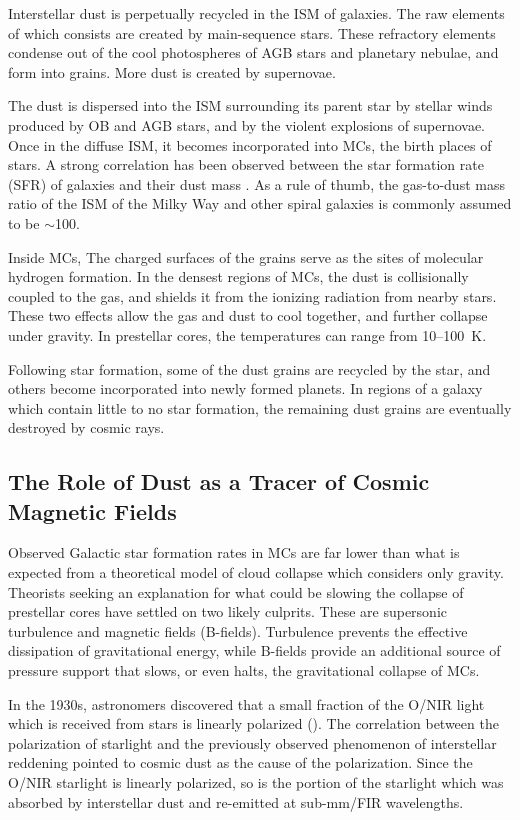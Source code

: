 Interstellar dust is perpetually recycled in the ISM of galaxies. The raw elements of which consists are created by main-sequence stars. These refractory elements condense out of the cool photospheres of AGB stars and planetary nebulae, and form into grains. More dust is created by supernovae.

The dust is dispersed into the ISM surrounding its parent star by stellar winds produced by OB and AGB stars, and by the violent explosions of supernovae. Once in the diffuse ISM, it becomes incorporated into MCs, the birth places of stars. A strong correlation has been observed between the star formation rate (SFR) of galaxies and their dust mass \citep{da2010new}. As a rule of thumb, the gas-to-dust mass ratio of the ISM of the Milky Way and other spiral galaxies is commonly assumed to be $\sim$100.

Inside MCs, The charged surfaces of the grains serve as the sites of molecular hydrogen formation. In the densest regions of MCs, the dust is collisionally coupled to the gas, and shields it from the ionizing radiation from nearby stars. These two effects allow the gas and dust to cool together, and further collapse under gravity. In prestellar cores, the temperatures can range from 10--100~K.

Following star formation, some of the dust grains are recycled by the star, and others become incorporated into newly formed planets. In regions of a galaxy which contain little to no star formation, the remaining dust grains are eventually destroyed by cosmic rays.

\subsection{The Role of Dust as a Tracer of Cosmic Magnetic Fields}\label{dust_fields}

Observed Galactic star formation rates in MCs are far lower than what is expected from a theoretical model of cloud collapse which considers only gravity. Theorists seeking an explanation for what could be slowing the collapse of prestellar cores have settled on two likely culprits. These are supersonic turbulence and magnetic fields (B-fields). Turbulence prevents the effective dissipation of gravitational energy, while B-fields provide an additional source of pressure support that slows, or even halts, the gravitational collapse of MCs.

In the 1930s, astronomers discovered that a small fraction of the O/NIR light which is received from stars is linearly polarized (\citet{hall1949observations,hiltner1949polarization}). The correlation between the polarization of starlight and the previously observed phenomenon of interstellar reddening pointed to cosmic dust as the cause of the polarization. Since the O/NIR starlight is linearly polarized, so is the portion of the starlight which was absorbed by interstellar dust and re-emitted at sub-mm/FIR wavelengths.

